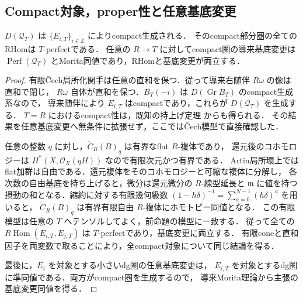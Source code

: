 \subsection{Compact対象，proper性と任意基底変更}
\begin{proposition}[Compact生成と相対proper性]
\label{prop:artin-compact-proper}
$D(\mathcal Q_T)$ は $\{E_{i,T}\}_{i\in\mathbb Z}$ によりcompact生成される．
そのcompact部分圏の全てのRHomは $T$-perfectである．
任意の $R\to T$ に対してcompact圏の導来基底変更は
$\operatorname{Perf}(\mathcal Q_T)$ とMorita同値であり，RHomと基底変更が両立する．
\end{proposition}
\begin{proof}
有限\v{C}ech局所化関手は任意の直和を保つ．従って導来右随伴 $R\omega$ の像は直和で閉じ，
$R\omega$ 自体が直和を保つ．$B_T(-i)$ は $D(\operatorname{Gr}B_T)$ のcompact生成系なので，
導来随伴により $E_{i,T}$ はcompactであり，これらが $D(\mathcal Q_T)$ を生成する．
$T=R$ におけるcompact性は，既知の持上げ定理
\cite[Propositions~5.8--5.9]{DDL2011}からも得られる．
その結果を任意基底変更へ無条件に拡張せず，ここでは\v{C}ech模型で直接確認した．

任意の整数 $q$ に対し，$\check C_R(B)_q$ は有界なflat $R$-複体であり，
還元後のコホモロジーは $H^*(X,\mathcal O_X(qH))$ なので有限次元かつ有界である．
Artin局所環上ではflat加群は自由である．還元複体をそのコホモロジーと可縮な複体に分解し，
各次数の自由基底を持ち上げると，微分は還元微分の $R$-線型延長と
$\mathfrak m$ に値を持つ摂動の和となる．縮約に対する有限幾何級数
$(1-h\delta)^{-1}=\sum_{a=0}^{N-1}(h\delta)^a$ を用いると，
$\check C_R(B)_q$ は有界有限自由 $R$-複体にホモトピー同値となる．
この有限模型は任意の $T$ へテンソルしてよく，前命題の模型に一致する．
従って全ての $R\operatorname{Hom}(E_{i,T},E_{j,T})$ は $T$-perfectであり，基底変更に両立する．
有限coneと直和因子を両変数で取ることにより，全compact対象について同じ結論を得る．

最後に，$E_i$ を対象とする小さいdg圏の任意基底変更は，
$E_{i,T}$ を対象とするdg圏に準同値である．両方がcompact圏を生成するので，
導来Morita理論\cite[\S4.3,\S8.2]{Keller1994}から主張の基底変更同値を得る．
\end{proof}

